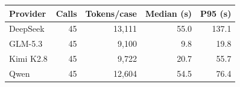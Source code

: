 \begin{tabular*}{\linewidth}{@{\extracolsep{\fill}}lrrrr@{}}
\toprule
Provider & Calls & Tokens/case & Median (s) & P95 (s) \\
\midrule
DeepSeek & 45 & 13,111 & 55.0 & 137.1 \\
GLM-5.3 & 45 & 9,100 & 9.8 & 19.8 \\
Kimi K2.8 & 45 & 9,722 & 20.7 & 55.7 \\
Qwen & 45 & 12,604 & 54.5 & 76.4 \\
\bottomrule
\end{tabular*}
